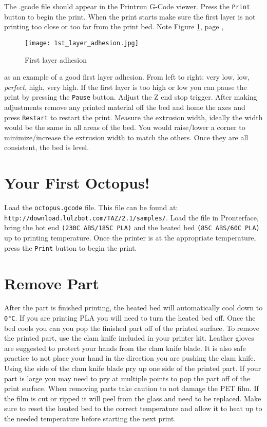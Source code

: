 The .gcode file should appear in the Printrun G-Code viewer. Press the \texttt{Print} button to begin the print. When the print starts make sure the first layer is not printing too close or too far from the print bed. Note 
Figure \ref{fig:1st_layer_adhesion}, page \pageref{fig:1st_layer_adhesion},
\begin{figure}[hbt]
\centering
\texttt{[image: 1st\_layer\_adhesion.jpg]}
\caption{First layer adhesion}
\label{fig:1st_layer_adhesion}
\end{figure}
as an example of a good first layer adhesion. From left to right: very low, low, \emph{perfect}, high, very high. If the first layer is too high or low you can pause the print by pressing the \texttt{Pause} button. Adjust the Z end stop trigger. After making adjustments remove any printed material off the bed and home the axes and press \texttt{Restart} to restart the print. Measure the extrusion width, ideally the width would be the same in all areas of the bed. You would raise/lower a corner to minimize/increase the extrusion width to match the others. Once they are all consistent, the bed is level.

\section{Your First Octopus!}
Load the \texttt{octopus.gcode} file. This file can be found at:
\texttt{http://download.lulzbot.com/TAZ/2.1/samples/}. Load the file in Pronterface, bring the hot end \texttt{(230C ABS/185C PLA)} and the heated bed \texttt{(85C ABS/60C PLA)} up to printing temperature. Once the printer is at the appropriate temperature, press the \texttt{Print} button to begin the print.

\section{Remove Part}
After the part is finished printing, the heated bed will automatically cool down to \texttt{0°C}. If you are printing PLA you will need to turn the heated bed off. Once the bed cools you can you pop the finished part off of the printed surface. To remove the printed part, use the clam knife included in your printer kit. Leather gloves are suggested to protect your hands from the clam knife blade. It is also safe practice to not place your hand in the direction you are pushing the clam knife. Using the side of the clam knife blade pry up one side of the printed part. If your part is large you may need to pry at multiple points to pop the part off of the print surface. When removing parts take caution to not damage the PET film. If the film is cut or ripped it will peel from the glass and need to be replaced. Make sure to reset the heated bed to the correct temperature and allow it to heat up to the needed temperature before starting the next print.

